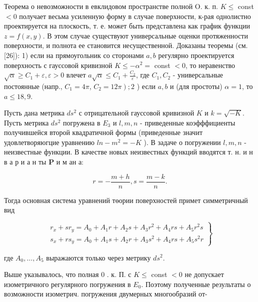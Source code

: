 \documentclass[10pt]{article}
\begin{document}
Теорема о невозможности в евклидовом пространстве полной O. к. п. $K \leqslant$ const $<0$ получает весьма усиленную форму в случае поверхности, к-рая однолистно проектируется на плоскость, т. е. может быть представлена как график функции $z=f(x, y)$. В этом случае существуют универсальные оценки протяженности поверхности, и полнота ее становится несущественной. Доказаны теоремы (см. [26]): 1) если на прямоугольник со сторонами $a, b$ регулярно проектируется поверхность с гауссовой кривизной $K \leqslant-\alpha^{2}=$ const $<0$, то неравенство $\sqrt{\alpha} \geqslant C_{1}+\varepsilon, \varepsilon>0$ влечет $a \sqrt{\alpha} \leqslant C_{1}+\frac{C_{2}}{\varepsilon}$, где $C_{1}, C_{2}$ - универсальные постоянные (напр., $C_{1}=4 \pi$, $\left.C_{2}=12 \pi\right) ; 2$ ) если $a, b$ и (для простоты) $\alpha=1$, то $a \leqslant 18,9$.

Пусть дана метрика $d s^{2}$ с отрицательной гауссовой кривизной $K$ и $k=\sqrt{-K}$. Пусть метрика $d s^{2}$ погружена в $E_{3}$ и $l, m, n$ - приведенные коэфффициенты получившейся второй квадратичной формы (приведенные значит удовлетворяюгцие уравнению $l n-m^{2}=-K$ ). В задаче о погружении $l, m, n$ - неизвестные функции. В качестве новых неизвестных функций вводятся т. н. и н в а р и а н ты $\mathbf{P}$ и м ан а:

\[
r=-\frac{m+h}{n}, s=\frac{m-k}{n} .
\]

Тогда основная система уравнений төории поверхностей примет симметричный вид

\[
\left.\begin{array}{l}
r_{x}+s r_{y}=A_{0}+A_{1} r+A_{2} s+A_{3} r^{2}+A_{4} r s+A_{5} r^{2} s \\
s_{x}+r s_{y}=A_{0}+A_{1} s+A_{2} r+A_{3} s^{2}+A_{4} r s+A_{5} s^{2} r
\end{array}\right\}
\]

где $A_{0}, \ldots, A_{5}$ выражаются только через метрику $d s^{2}$.

Выше указывалось, что полная 0 . к. П. с $K \leqslant$ const $<0$ не допускает изометричного регулярного погружения в $E_{0}$. Поэтому полученные результаты о возможности изометрич. погружения двумерных многообразий от-
\end{document}
